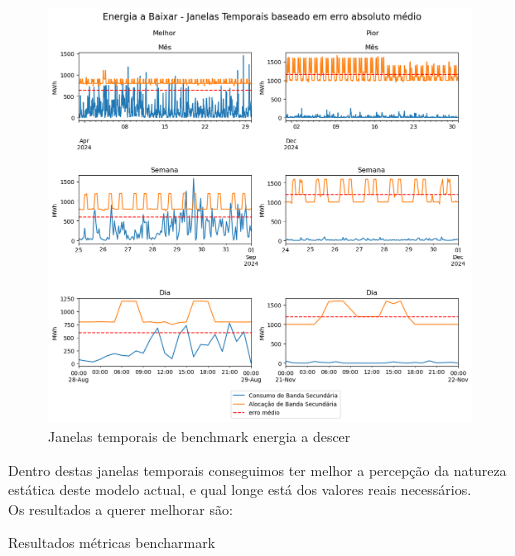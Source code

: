\begin{figure}[H]
    \centering
    \includegraphics[width=\textwidth]{plots/alocacoes_temporais_downward_dataset.png}
    \caption{Janelas temporais de benchmark energia a descer}
    \label{fig:benchmarktimewindowsdown}
\end{figure}

Dentro destas janelas temporais conseguimos ter melhor a percepção da natureza estática deste modelo actual, e qual longe está dos valores reais necessários.\\

Os resultados a querer melhorar são:\\
\begin{table}[H]
    \caption{Resultados métricas bencharmark}    
    \resizebox{\linewidth}{!}{}
    \label{tab:benchmarkmetrics}
    \end{table}